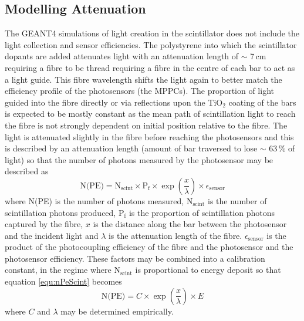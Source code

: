 \subsection{Modelling Attenuation}\label{sec:GEANT4Simulation_ModellingAttenuation}
The GEANT4 simulations of light creation in the scintillator does not include the light collection and sensor efficiencies. The polystyrene into which the scintillator dopants are
added attenuates light with an attenuation length of $\sim$ 7\,cm requiring a fibre to be thread requiring a fibre in the centre of each bar to act as a light guide. This fibre wavelength shifts the light again to better match the efficiency profile of the photosensors (the MPPCs). The proportion of light guided into the fibre directly or via reflections upon the TiO$_2$ coating of the bars is expected to be mostly constant as the mean path of scintillation light to reach the fibre is not strongly dependent on initial position relative to the fibre. The light is attenuated slightly in the fibre before reaching the photosensors and this is described by an attenuation length (amount of bar traversed to lose $\sim$ 63\,\%  of light) so that the number of photons measured by the photosensor may be described as
\begin{equation}
    \textrm{N(PE)} = \textrm{N$_{\textrm{scint}}$} \times \textrm{P$_\textrm{f}$} \times \exp{ \left( \frac{x}{\lambda} \right) } \times \epsilon\textrm{$_{\textrm{sensor}}$}
\label{equ:nPeScint}
\end{equation}
where N(PE) is the number of photons measured, N$_{\textrm{scint}}$ is the number of scintillation photons produced, P$_\textrm{f}$ is the proportion of scintillation photons captured by the fibre, $x$ is the distance along the bar between the photosensor and the incident light and $\lambda$ is the attenuation length of the fibre. $\epsilon_{\textrm{sensor}}$ is the product of the photocoupling efficiency of the fibre and the photosensor and the photosensor efficiency. These factors may be combined into a calibration constant, in the regime where N$_{\textrm{scint}}$ is proportional to energy deposit so that equation \ref{equ:nPeScint} becomes
\begin{equation}
     \textrm{N(PE)} = C \times \exp{ \left( \frac{x}{\lambda} \right) } \times E 
 \label{equ:nPeScint2}
 \end{equation}
where $C$ and $\lambda$ may be determined empirically.
